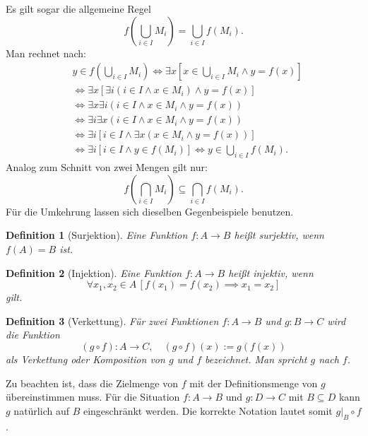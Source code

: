 \documentclass[a4paper,11pt,fleqn,twoside]{scrartcl}
\numberwithin{equation}{section}
\theoremstyle{rmbox}
\newtheorem{Definition}{Definition}
\begin{document}
Es gilt sogar die allgemeine Regel
\begin{equation}
f(\bigcup_{i\in I} M_i) = \bigcup_{i\in I} f(M_i).
\end{equation}
Man rechnet nach:
\begin{align}
& y\in f(\bigcup_{i\in I} M_i)
\iff \exists x[x\in\bigcup_{i\in I} M_i\land y=f(x)]\\
& \iff \exists x[\exists i(i\in I\land x\in M_i)\land y=f(x)]\\
& \iff \exists x\exists i(i\in I\land x\in M_i\land y=f(x))\\
& \iff \exists i\exists x(i\in I\land x\in M_i\land y=f(x))\\
& \iff \exists i[i\in I\land\exists x(x\in M_i\land y=f(x))]\\
& \iff \exists i[i\in I\land y\in f(M_i)]
\iff y\in \bigcup_{i\in I} f(M_i).
\end{align}
Analog zum Schnitt von zwei Mengen gilt nur:
\begin{equation}
f(\bigcap_{i\in I} M_i) \subseteq \bigcap_{i\in I} f(M_i).
\end{equation}
Für die Umkehrung lassen sich dieselben Gegenbeispiele benutzen.

\begin{Definition}[Surjektion]
Eine Funktion $f\colon A\to B$ heißt \emph{surjektiv}, wenn $f(A)=B$ ist.
\end{Definition}

\begin{Definition}[Injektion]
Eine Funktion $f\colon A\to B$ heißt \emph{injektiv}, wenn
\begin{equation}
\forall x_1,x_2\in A\,[f(x_1)=f(x_2)\implies x_1=x_2]
\end{equation}
gilt.
\end{Definition}

\begin{Definition}[Verkettung]
Für zwei Funktionen $f\colon A\to B$ und $g\colon B\to C$ wird
die Funktion
\begin{equation}
(g\circ f)\colon A\to C,\quad (g\circ f)(x):=g(f(x))
\end{equation}
als \emph{Verkettung} oder \emph{Komposition} von $g$ und $f$
bezeichnet. Man spricht \emph{$g$ nach $f$}.
\end{Definition}

Zu beachten ist, dass die Zielmenge von $f$ mit der Definitionsmenge
von $g$ übereinstimmen muss. Für die Situation $f\colon A\to B$
und $g\colon D\to C$ mit $B\subseteq D$ kann $g$ natürlich auf
$B$ eingeschränkt werden. Die korrekte Notation lautet somit
$g|_B\circ f$.
\end{document}
